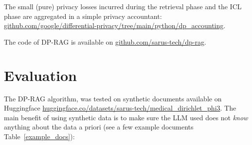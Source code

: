 \documentclass[conference]{IEEEtran}
\begin{document}
The small (pure) privacy losses incurred during the retrieval phase and
the ICL phase are aggregated in a simple privacy accountant:
\href{https://github.com/google/differential-privacy/tree/main/python/dp_accounting}{github.com/google/differential-privacy/tree/main/python/dp\_accounting}.

The code of DP-RAG is available on
\href{https://github.com/sarus-tech/dp-rag}{github.com/sarus-tech/dp-rag}.

\section{Evaluation}\label{evaluation}

The DP-RAG algorithm, was tested on synthetic documents available on
Huggingface
\href{https://huggingface.co/datasets/sarus-tech/medical_dirichlet_phi3}{huggingface.co/datasets/sarus-tech/medical\_dirichlet\_phi3}.
The main benefit of using synthetic data is to make sure the LLM used
does not \emph{know} anything about the data a priori (see a few example documents Table~\ref{example_docs}):
\end{document}
